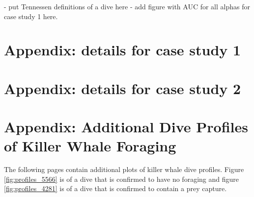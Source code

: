 \newpage

- put Tennessen definitions of a dive here
- add figure with AUC for all alphas for case study 1 here.

\section{Appendix: details for case study 1}


\section{Appendix: details for case study 2}


\section{Appendix: Additional Dive Profiles of Killer Whale Foraging}

The following pages contain additional plots of killer whale dive profiles. Figure \ref{fig:profiles_5566} is of a dive that is confirmed to have no foraging and figure \ref{fig:profiles_4281} is of a dive that is confirmed to contain a prey capture.

